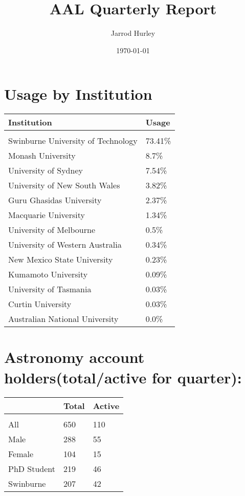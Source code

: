 \documentclass{article}%
\title{AAL Quarterly Report}%
\author{Jarrod Hurley}%
\date{\today}%
\begin{document}
%
\normalsize%
\maketitle%
\newpage%
\section{Usage by Institution }%

%
\begin{longtabu}{X[l] X[r]}%
\textbf{Institution}&\textbf{Usage}\\%
\hline%
&\\%
Swinburne University of Technology&73.41\%\\%
\hline%
Monash University&8.7\%\\%
\hline%
University of Sydney&7.54\%\\%
\hline%
University of New South Wales&3.82\%\\%
\hline%
Guru Ghasidas University&2.37\%\\%
\hline%
Macquarie University&1.34\%\\%
\hline%
University of Melbourne&0.5\%\\%
\hline%
University of Western Australia&0.34\%\\%
\hline%
New Mexico State University&0.23\%\\%
\hline%
Kumamoto University&0.09\%\\%
\hline%
University of Tasmania&0.03\%\\%
\hline%
Curtin University&0.03\%\\%
\hline%
Australian National University&0.0\%\\%
\hline%
\end{longtabu}%
\section{Astronomy account holders(total/active for quarter): }%

%
\begin{longtabu}{X[l] X[r] X[r]}%
\textbf{}&\textbf{Total}&\textbf{Active}\\%
\hline%
&&\\%
All&650&110\\%
\hline%
Male&288&55\\%
\hline%
Female&104&15\\%
\hline%
PhD Student&219&46\\%
\hline%
Swinburne&207&42\\%
\hline%
\end{longtabu}%
\end{document}
